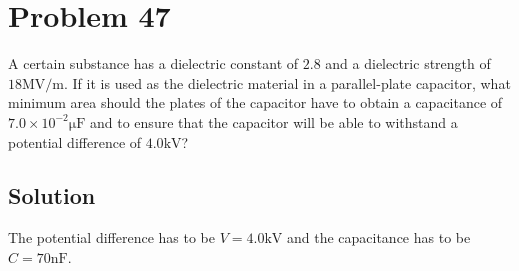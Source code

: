 \documentclass[12pt]{article}
\begin{document}
\pagebreak
\section{Problem 47}
A certain substance has a dielectric constant of $2.8$ and a dielectric strength of $18 \unit{\mega\volt/\meter}$. 
If it is used as the dielectric material in a parallel-plate capacitor, what minimum area should the plates of the capacitor have to obtain a capacitance of $7.0 \times 10^{-2} \unit{\micro\farad}$ and to ensure that the capacitor will be able to withstand a potential difference of $4.0 \unit{\kilo\volt}$?

\subsection*{Solution}
The potential difference has to be $V = 4.0 \unit{\kilo\volt}$ and the capacitance has to be $C = 70 \unit{\nano\farad}$. 
\end{document}
